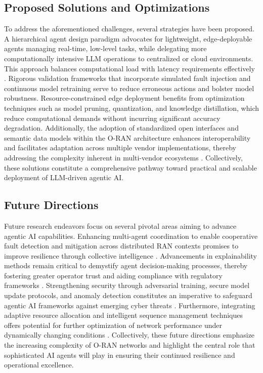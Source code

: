 \documentclass[sigconf]{acmart}
\begin{document}
\subsection{Proposed Solutions and Optimizations}

To address the aforementioned challenges, several strategies have been proposed. A hierarchical agent design paradigm advocates for lightweight, edge-deployable agents managing real-time, low-level tasks, while delegating more computationally intensive LLM operations to centralized or cloud environments. This approach balances computational load with latency requirements effectively \cite{ref55}. Rigorous validation frameworks that incorporate simulated fault injection and continuous model retraining serve to reduce erroneous actions and bolster model robustness. Resource-constrained edge deployment benefits from optimization techniques such as model pruning, quantization, and knowledge distillation, which reduce computational demands without incurring significant accuracy degradation. Additionally, the adoption of standardized open interfaces and semantic data models within the O-RAN architecture enhances interoperability and facilitates adaptation across multiple vendor implementations, thereby addressing the complexity inherent in multi-vendor ecosystems \cite{ref55}. Collectively, these solutions constitute a comprehensive pathway toward practical and scalable deployment of LLM-driven agentic AI.

\subsection{Future Directions}

Future research endeavors focus on several pivotal areas aiming to advance agentic AI capabilities. Enhancing multi-agent coordination to enable cooperative fault detection and mitigation across distributed RAN contexts promises to improve resilience through collective intelligence \cite{ref21}. Advancements in explainability methods remain critical to demystify agent decision-making processes, thereby fostering greater operator trust and aiding compliance with regulatory frameworks \cite{ref48}. Strengthening security through adversarial training, secure model update protocols, and anomaly detection constitutes an imperative to safeguard agentic AI frameworks against emerging cyber threats \cite{ref50}. Furthermore, integrating adaptive resource allocation and intelligent sequence management techniques offers potential for further optimization of network performance under dynamically changing conditions \cite{ref21}. Collectively, these future directions emphasize the increasing complexity of O-RAN networks and highlight the central role that sophisticated AI agents will play in ensuring their continued resilience and operational excellence.
\end{document}
